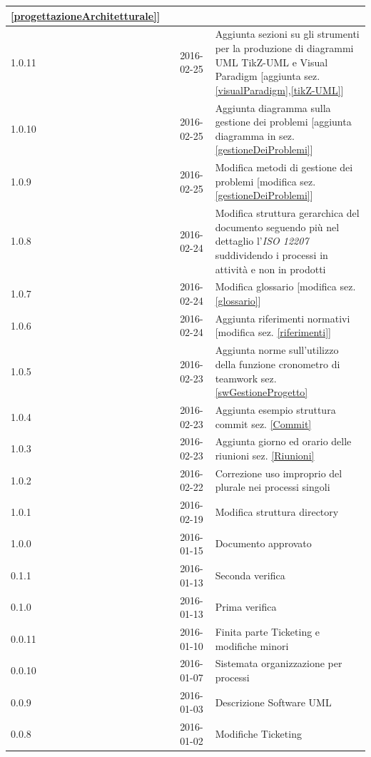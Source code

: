 \documentclass[12pt,a4paper]{article}
\begin{document}
\begin{center}
\begin{longtable}[H]{p{} p{} p{} p{}}
		\ref{progettazioneArchitetturale}]\\*
		\midrule
		1.0.11 & \TP{} & 2016-02-25 & Aggiunta sezioni su gli strumenti per la produzione di diagrammi UML TikZ-UML e Visual Paradigm [aggiunta sez. \ref{visualParadigm},\ref{tikZ-UML}]\\*
		\midrule
		1.0.10 & \TP{} & 2016-02-25 & Aggiunta diagramma sulla gestione dei problemi [aggiunta diagramma in sez. \ref{gestioneDeiProblemi}] \\*
		\midrule
		1.0.9 & \TP{} & 2016-02-25 & Modifica metodi di gestione dei problemi [modifica sez. \ref{gestioneDeiProblemi}]  \\*
		\midrule
		1.0.8 & \TP{} & 2016-02-24 & Modifica struttura gerarchica del documento seguendo più nel dettaglio l'\textit{ISO 12207} suddividendo i processi in attività e non in prodotti \\*
		\midrule
		1.0.7 & \TP{} & 2016-02-24 & Modifica glossario [modifica sez. \ref{glossario}] \\*
		\midrule
		1.0.6 & \TP{} & 2016-02-24 & Aggiunta riferimenti normativi [modifica sez. \ref{riferimenti}] \\*
		\midrule
		1.0.5 & \TP & 2016-02-23 & Aggiunta norme sull'utilizzo della funzione cronometro di teamwork sez. \ref{swGestioneProgetto}\\*
		\midrule
		1.0.4 & \TP & 2016-02-23 & Aggiunta esempio struttura commit sez. \ref{Commit}\\*
		\midrule
		1.0.3 & \TP & 2016-02-23 & Aggiunta giorno ed orario delle riunioni sez. \ref{Riunioni}\\*
		\midrule
		1.0.2 & \TP & 2016-02-22 & Correzione uso improprio del plurale nei processi singoli \\*
		\midrule
		1.0.1 & \TP & 2016-02-19 & Modifica struttura directory \\*
		\midrule
		1.0.0 & \IB & 2016-01-15 & Documento approvato \\*
		\midrule
		0.1.1 & \TP & 2016-01-13 & Seconda verifica \\*
		\midrule
		0.1.0 & \WS & 2016-01-13 & Prima verifica \\*
		\midrule
		0.0.11 & \NDC & 2016-01-10 & Finita parte Ticketing e modifiche minori \\*
		\midrule
		0.0.10 & \NDC & 2016-01-07 & Sistemata organizzazione per processi \\*
		\midrule
		0.0.9 & \AVE & 2016-01-03 & Descrizione Software UML \\*
		\midrule
		0.0.8 & \AVE & 2016-01-02 & Modifiche Ticketing \\*

\end{longtable}
\end{center}
\end{document}
